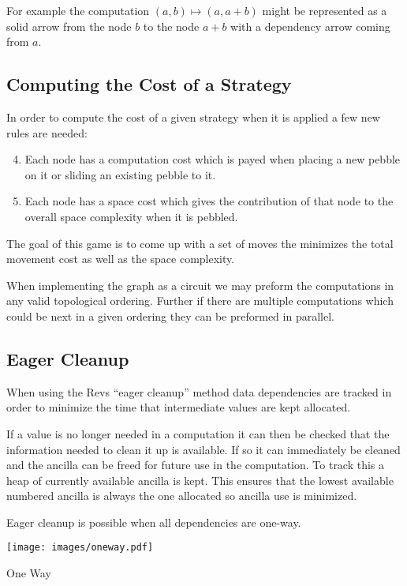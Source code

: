 For example the computation $(a,b)\mapsto(a,a+b)$ might be represented as a
solid arrow from the node $b$ to the node $a+b$ with a dependency arrow coming
from $a$.


\subsection{Computing the Cost of a Strategy}

In order to compute the cost of a given strategy when it is applied a few
new rules are needed:

\begin{enumerate}
    \setcounter{enumi}{3}
  \item Each node has a computation cost which is payed when placing a new pebble on
    it or sliding an existing pebble to it.
  \item Each node has a space cost which gives the contribution of that node to
    the overall space complexity when it is pebbled.
\end{enumerate}

The goal of this game is to come up with a set of moves the minimizes the total
movement cost as well as the space complexity.

When implementing the graph as a circuit we may preform the computations in any
valid topological ordering. Further if there are multiple computations which
could be next in a given ordering they can be preformed in parallel.

\subsection{Eager Cleanup}

When using the Revs ``eager cleanup'' method data dependencies are tracked in
order to minimize the time that intermediate values are kept allocated.

If a value is no longer needed in a computation it can then be checked that the
information needed to clean it up is available. If so it can immediately be
cleaned and the ancilla can be freed for future use in the computation. To track
this a heap of currently available ancilla is kept.  This ensures that the
lowest available numbered ancilla is always the one allocated so ancilla use is
minimized.

Eager cleanup is possible when all dependencies are one-way.

\begin{marginfigure}
  \texttt{[image: images/oneway.pdf]}
  \caption{One Way}
\end{marginfigure}

